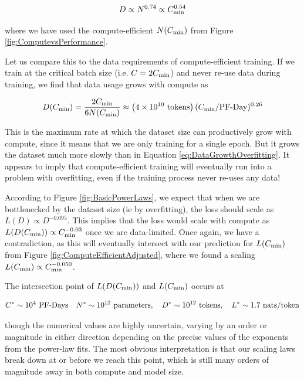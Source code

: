 \begin{equation}
\label{eq:DataGrowthOverfitting}
D \propto N^{0.74} \propto C_{\rm min}^{0.54}
\end{equation}

where we have used the compute-efficient $N(C_{\rm min})$ from Figure \ref{fig:ComputevsPerformance}.

Let us compare this to the data requirements of compute-efficient training.  If we train at the critical batch size (i.e. $C=2C_{\rm min}$) and never re-use data during training, we find that data usage grows with compute as

\begin{equation}
D (C_{\rm min}) = \frac{2C_{\rm min}}{6 N(C_{\rm min})} \approx \left( 4 \times 10^{10}  \ {\rm tokens} \right) (C_{\rm min} / \mathrm{PF}{\text -}\mathrm{Day}  )^{0.26} 
\end{equation}

This is the maximum rate at which the dataset size can productively grow with compute, since it means that we are only training for a single epoch.  But it grows the dataset much more slowly than in Equation \eqref{eq:DataGrowthOverfitting}.  It appears to imply that compute-efficient training will eventually run into a problem with overfitting, even if the training process never re-uses any data!

According to Figure \ref{fig:BasicPowerLaws}, we expect that when we are bottlenecked by the dataset size (ie by overfitting), the loss should scale as $L(D) \propto D^{-0.095}$.  This implies that the loss would scale with compute as $L(D(C_{\rm min})) \propto C_{\rm min}^{-0.03}$ once we are data-limited.  Once again, we have a contradiction, as this will eventually intersect with our prediction for $L(C_{\rm min})$ from Figure \ref{fig:ComputeEfficientAdjusted}, where we found a scaling $L(C_{\rm min}) \propto C_{\rm min}^{-0.050}$.  

The intersection point of $L(D(C_{\rm min}))$ and $L(C_{\rm min})$ occurs at

\begin{equation}
C^* \sim 10^4~\mathrm{PF}{\text -}\mathrm{Days}
\quad
N^* \sim 10^{12}~\text{parameters},
\quad
D^* \sim 10^{12}~\text{tokens},
\quad
L^* \sim 1.7~\text{nats/token}
\label{eq:SpecialPoint}
\end{equation}

though the numerical values are highly uncertain, varying by an order or magnitude in either direction depending on the precise values of the exponents from the power-law fits.  The most obvious interpretation is that our scaling laws break down at or before we reach this point, which is still many orders of magnitude away in both compute and model size.  

